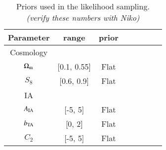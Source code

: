 \begin{table}
   \centering
   \caption{Priors used in the likelihood sampling. {\it (verify these numbers with Niko)}}
   \tabcolsep=0.11cm
      \begin{tabular}{@{} cccccccc @{}} %
      \hline
      \hline
       Parameter       &  range & prior \\
       \hline
       Cosmology\\ 
       $\Omega_{\rm m}$ &[0.1, 0.55] & Flat\\
       $S_8$ & [0.6, 0.9] & Flat\\
       \hline
       IA\\
       $A_{\rm IA}$ & [-5, 5]&  Flat\\                    
        $b_{\rm TA}$ & [0, 2] & Flat\\
        $C_2$ & [-5, 5] & Flat\\
     \hline
    \hline 
    \end{tabular}
    \label{table:priors}
\end{table}
